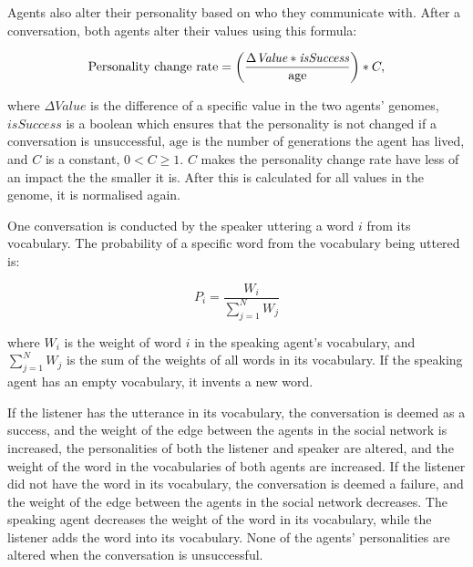 Agents also alter their personality based on who they communicate with. After a conversation, both agents alter their values using this formula:

\begin{equation}\label{eq:PCR}
\text{Personality change rate} = \left( \frac{\Delta \textit{Value} \ast \textit{isSuccess}}{\text{age}} \right)\ast C,
\end{equation}

where $\Delta \textit{Value}$ is the difference of a specific value in the two agents' genomes, $\textit{isSuccess}$ is a boolean which ensures that the personality is not changed if a conversation is unsuccessful, $\text{age}$ is the number of generations the agent has lived, and $C$ is a constant, $0 < C \geq 1$. $C$ makes the personality change rate have less of an impact the the smaller it is. After this is calculated for all values in the genome, it is normalised again.

One conversation is conducted by the speaker uttering a word $i$ from its vocabulary. The probability of a specific word from the vocabulary being uttered is:

\begin{equation}\label{eq:chooseWordprob}
P_{i} = \frac{W_{i}}{\sum_{j=1}^{N}W_{j}}
\end{equation}

where $W_{i}$ is the weight of word $i$ in the speaking agent's vocabulary, and $\sum_{j=1}^{N}W_{j}$ is the sum of the weights of all words in its vocabulary. If the speaking agent has an empty vocabulary, it invents a new word. 

If the listener has the utterance in its vocabulary, the conversation is deemed as a success, and the weight of the edge between the agents in the social network is increased, the personalities of both the listener and speaker are altered, and the weight of the word in the vocabularies of both agents are increased. If the listener did not have the word in its vocabulary, the conversation is deemed a failure, and the weight of the edge between the agents in the social network decreases. The speaking agent decreases the weight of the word in its vocabulary, while the listener adds the word into its vocabulary. None of the agents' personalities are altered when the conversation is unsuccessful.

